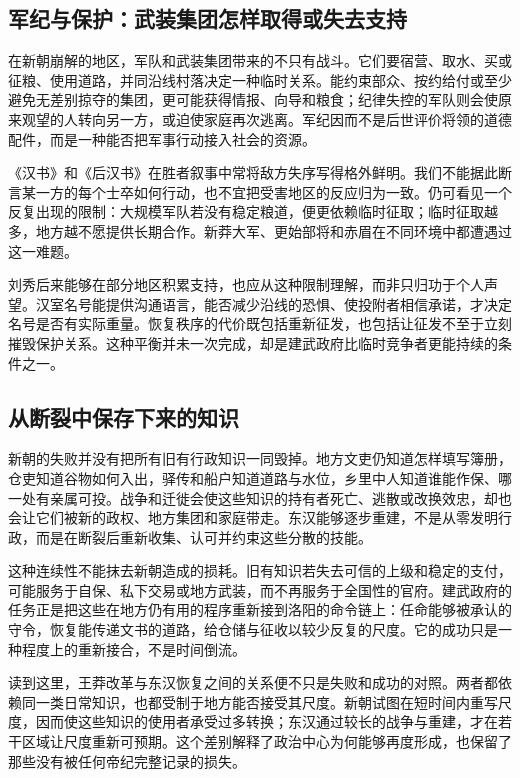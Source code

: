 \subsection{军纪与保护：武装集团怎样取得或失去支持}

在新朝崩解的地区，军队和武装集团带来的不只有战斗。它们要宿营、取水、买或征粮、使用道路，并同沿线村落决定一种临时关系。能约束部众、按约给付或至少避免无差别掠夺的集团，更可能获得情报、向导和粮食；纪律失控的军队则会使原来观望的人转向另一方，或迫使家庭再次逃离。军纪因而不是后世评价将领的道德配件，而是一种能否把军事行动接入社会的资源。

《汉书》和《后汉书》在胜者叙事中常将敌方失序写得格外鲜明。我们不能据此断言某一方的每个士卒如何行动，也不宜把受害地区的反应归为一致。仍可看见一个反复出现的限制：大规模军队若没有稳定粮道，便更依赖临时征取；临时征取越多，地方越不愿提供长期合作。新莽大军、更始部将和赤眉在不同环境中都遭遇过这一难题。

刘秀后来能够在部分地区积累支持，也应从这种限制理解，而非只归功于个人声望。汉室名号能提供沟通语言，能否减少沿线的恐惧、使投附者相信承诺，才决定名号是否有实际重量。恢复秩序的代价既包括重新征发，也包括让征发不至于立刻摧毁保护关系。这种平衡并未一次完成，却是建武政府比临时竞争者更能持续的条件之一。

\subsection{从断裂中保存下来的知识}

新朝的失败并没有把所有旧有行政知识一同毁掉。地方文吏仍知道怎样填写簿册，仓吏知道谷物如何入出，驿传和船户知道道路与水位，乡里中人知道谁能作保、哪一处有亲属可投。战争和迁徙会使这些知识的持有者死亡、逃散或改换效忠，却也会让它们被新的政权、地方集团和家庭带走。东汉能够逐步重建，不是从零发明行政，而是在断裂后重新收集、认可并约束这些分散的技能。

这种连续性不能抹去新朝造成的损耗。旧有知识若失去可信的上级和稳定的支付，可能服务于自保、私下交易或地方武装，而不再服务于全国性的官府。建武政府的任务正是把这些在地方仍有用的程序重新接到洛阳的命令链上：任命能够被承认的守令，恢复能传递文书的道路，给仓储与征收以较少反复的尺度。它的成功只是一种程度上的重新接合，不是时间倒流。

读到这里，王莽改革与东汉恢复之间的关系便不只是失败和成功的对照。两者都依赖同一类日常知识，也都受制于地方能否接受其尺度。新朝试图在短时间内重写尺度，因而使这些知识的使用者承受过多转换；东汉通过较长的战争与重建，才在若干区域让尺度重新可预期。这个差别解释了政治中心为何能够再度形成，也保留了那些没有被任何帝纪完整记录的损失。

